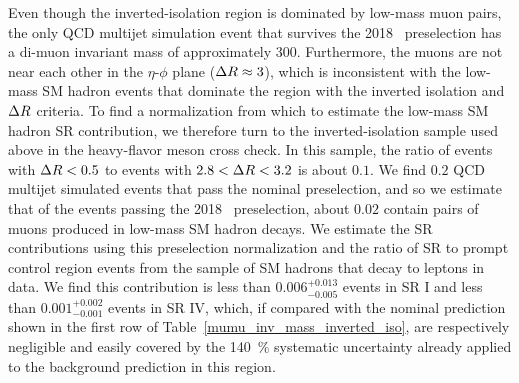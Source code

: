 Even though the inverted-isolation region is dominated by low-mass muon pairs, the only QCD multijet simulation event that survives the 2018 \Pgm\Pgm\ preselection has a di-muon invariant mass of approximately 300\GeV. Furthermore, the muons are not near each other in the $\eta$-$\phi$ plane ($\Delta R\approx3$), which is inconsistent with the low-mass SM hadron events that dominate the region with the inverted isolation and $\Delta R$ criteria. To find a normalization from which to estimate the low-mass SM hadron SR contribution, we therefore turn to the inverted-isolation sample used above in the heavy-flavor meson cross check. In this sample, the ratio of events with $\Delta R<0.5$ to events with $2.8<\Delta R<3.2$ is about $0.1$. We find $0.2$ QCD multijet simulated events that pass the nominal preselection, and so we estimate that of the events passing the 2018 \Pgm\Pgm\ preselection, about $0.02$ contain pairs of muons produced in low-mass SM hadron decays. We estimate the SR contributions using this preselection normalization and the ratio of SR to prompt control region events from the sample of SM hadrons that decay to leptons in data. We find this contribution is less than $0.006^{+0.013}_{-0.005}$ events in SR I and less than $0.001^{+0.002}_{-0.001}$ events in SR IV, which, if compared with the nominal prediction shown in the first row of Table~\ref{mumu_inv_mass_inverted_iso}, are respectively negligible and easily covered by the \SI{140}{\percent} systematic uncertainty already applied to the background prediction in this region.

\pagebreak